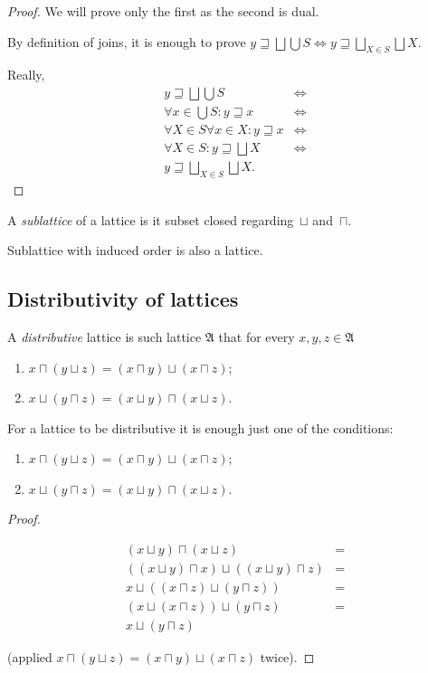 \begin{proof}
We will prove only the first as the second is dual.

By definition of joins, it is enough to prove $y\sqsupseteq\bigsqcup\bigcup S\Leftrightarrow y\sqsupseteq\bigsqcup_{X\in S}\bigsqcup X$.

Really,
\begin{align*}
y\sqsupseteq\bigsqcup\bigcup S & \Leftrightarrow\\
\forall x\in\bigcup S:y\sqsupseteq x & \Leftrightarrow\\
\forall X\in S\forall x\in X:y\sqsupseteq x & \Leftrightarrow\\
\forall X\in S:y\sqsupseteq\bigsqcup X & \Leftrightarrow\\
y\sqsupseteq\bigsqcup_{X\in S}\bigsqcup X.
\end{align*}
\end{proof}
\begin{defn}
A \emph{sublattice} of a lattice is it subset closed regarding~$\sqcup$
and~$\sqcap$.\end{defn}
\begin{obvious}
Sublattice with induced order is also a lattice.
\end{obvious}

\subsection{Distributivity of lattices}
\begin{defn}
A \emph{distributive} lattice is such
lattice $\mathfrak{A}$ that for every $x,y,z\in\mathfrak{A}$
\begin{enumerate}
\item $x\sqcap(y\sqcup z)=(x\sqcap y)\sqcup(x\sqcap z)$;
\item $x\sqcup(y\sqcap z)=(x\sqcup y)\sqcap(x\sqcup z)$.
\end{enumerate}
\end{defn}
\begin{thm}
For a lattice to be distributive it is enough just one of the conditions:
\begin{enumerate}
\item $x\sqcap(y\sqcup z)=(x\sqcap y)\sqcup(x\sqcap z)$;
\item $x\sqcup(y\sqcap z)=(x\sqcup y)\sqcap(x\sqcup z)$.
\end{enumerate}
\end{thm}
\begin{proof}
~

\begin{align*}
(x\sqcup y)\sqcap(x\sqcup z) & =\\
((x\sqcup y)\sqcap x)\sqcup((x\sqcup y)\sqcap z) & =\\
x\sqcup((x\sqcap z)\sqcup(y\sqcap z)) & =\\
(x\sqcup(x\sqcap z))\sqcup(y\sqcap z) & =\\
x\sqcup(y\sqcap z)
\end{align*}


(applied $x\sqcap(y\sqcup z)=(x\sqcap y)\sqcup(x\sqcap z)$ twice).
\end{proof}

